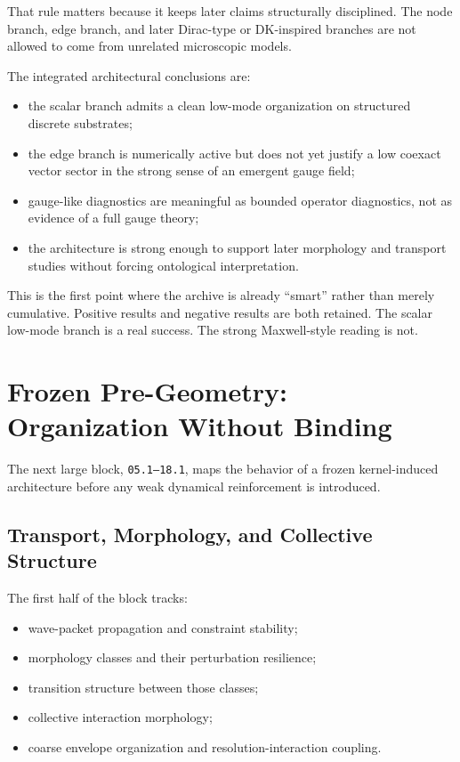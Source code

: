 \documentclass[11pt]{article}
\begin{document}
That rule matters because it keeps later claims structurally disciplined. The node branch, edge branch, and later Dirac-type or DK-inspired branches are not allowed to come from unrelated microscopic models.

The integrated architectural conclusions are:
\begin{itemize}
\item the scalar branch admits a clean low-mode organization on structured discrete substrates;
\item the edge branch is numerically active but does not yet justify a low coexact vector sector in the strong sense of an emergent gauge field;
\item gauge-like diagnostics are meaningful as bounded operator diagnostics, not as evidence of a full gauge theory;
\item the architecture is strong enough to support later morphology and transport studies without forcing ontological interpretation.
\end{itemize}

This is the first point where the archive is already ``smart'' rather than merely cumulative. Positive results and negative results are both retained. The scalar low-mode branch is a real success. The strong Maxwell-style reading is not.

\section{Frozen Pre-Geometry: Organization Without Binding}

The next large block, \texttt{05.1--18.1}, maps the behavior of a frozen kernel-induced architecture before any weak dynamical reinforcement is introduced.

\subsection{Transport, Morphology, and Collective Structure}

The first half of the block tracks:
\begin{itemize}
\item wave-packet propagation and constraint stability;
\item morphology classes and their perturbation resilience;
\item transition structure between those classes;
\item collective interaction morphology;
\item coarse envelope organization and resolution-interaction coupling.
\end{itemize}
\end{document}
